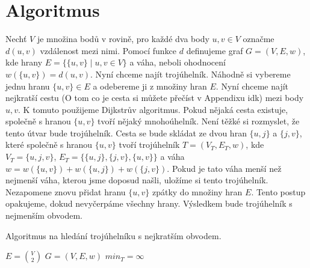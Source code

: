 \section{Algoritmus}
\label{sec:algoritmus}

Nechť $V$ je množina bodů v rovině, pro každé dva body $u, v \in V$ označme $d(u, v)$ vzdálenost mezi nimi. Pomocí funkce $d$ definujeme graf $G = (V, E, w)$, kde hrany $E = \{\{u, v\} \mid u, v \in V\}$ a váha, neboli ohodnocení $w(\{u, v\}) = d(u, v)$. Nyní chceme najít trojúhelník. Náhodně si vybereme jednu hranu $\{u, v\} \in E$ a odebereme ji z množiny hran $E$. Nyní chceme najít nejkratší cestu (O tom co je cesta si můžete přečíst v Appendixu idk) mezi body $u, v$. K tomuto použijeme Dijkstrův algoritmus. Pokud nějaká cesta existuje, společně s hranou $\{u, v\}$ tvoří nějaký mnohoúhelník. Není těžké si rozmyslet, že tento útvar bude trojúhelník. Cesta se bude skládat ze dvou hran $\{u, j\}$ a $\{j, v\}$, které společně s hranou $\{u, v\}$ tvoří trojúhelník $T = (V_T, E_T, w)$, kde $V_T = \{u, j, v\}$, $E_T = \{\{u,j\}, \{j,v\}, \{u,v\}\}$ a váha $w = w(\{u, v\}) + w(\{u, j\}) + w(\{j, v\})$. Pokud je tato váha menší než nejmenší váha, kterou jsme doposud našli, uložíme si tento trojúhelník. Nezapomene znovu přidat hranu $\{u, v\}$ zpátky do množiny hran $E$. Tento postup opakujeme, dokud nevyčerpáme všechny hrany. Výsledkem bude trojúhelník s nejmenším obvodem.

\begin{algorithm}
    \caption{Algoritmus na hledání trojúhelníku s nejkratším obvodem.}
    \label{alg:algoritmus}
   
   
    \BlankLine
    $ E = {{V}\choose{2}}$\;
    $ G = (V, E, w)$\;
    $min_T = \infty$\;
    \;
   \end{algorithm}